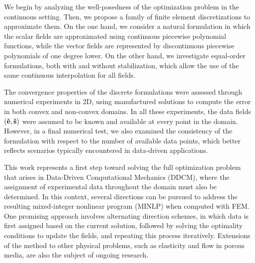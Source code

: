 \documentclass[12pt]{article}
\begin{document}
We begin by analyzing the well-posedness of the optimization problem in the continuous setting. Then, we propose a family of finite element discretizations to approximate them.
On the one hand, we consider a natural formulation in which the scalar fields are approximated using continuous piecewise polynomial functions, while the vector fields are represented by discontinuous piecewise polynomials of one degree lower.
On the other hand, we investigate equal-order formulations, both with and without stabilization, which allow the use of the same continuous interpolation for all fields.

The convergence properties of the discrete formulations were assessed through numerical experiments in 2D, using manufactured solutions to compute the error in both convex and non-convex domains. In all these experiments, the data fields $(\mathbf{\tilde{e}}, \mathbf{\tilde{s}})$ were assumed to be known and available at every point in the domain. However, in a final numerical test, we also examined the consistency of the formulation with respect to the number of available data points, which better reflects scenarios typically encountered in data-driven applications.

This work represents a first step toward solving the full optimization problem that arises in Data-Driven Computational Mechanics (DDCM), where the assignment of experimental data throughout the domain must also be determined. In this context, several directions can be pursued to address the resulting mixed-integer nonlinear program (MINLP) when computed with FEM. One promising approach involves alternating direction schemes, in which data is first assigned based on the current solution, followed by solving the optimality conditions to update the fields, and repeating this process iteratively. Extensions of the method to other physical problems, such as elasticity and flow in porous media, are also the subject of ongoing research.
 




\end{document}

